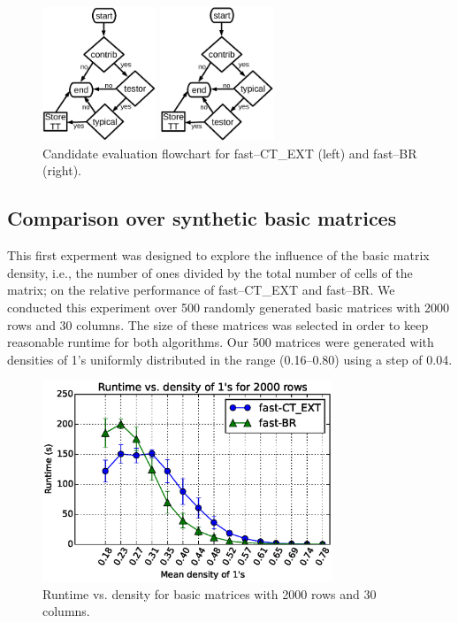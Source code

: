 \documentclass[citenumber]{llncs}
\begin{document}
	\begin{figure}[htb]
	    \centering
	    \begin{minipage}{.5\textwidth}
	        \centering
	        \includegraphics[height=4cm]{ct_ext.eps}
	    \end{minipage}%
	    \begin{minipage}{0.5\textwidth}
	        \centering
	        \includegraphics[height=4cm]{BR.eps}	        
	    \end{minipage}
		\caption{Candidate evaluation flowchart for fast--CT\_EXT (left) and fast--BR (right).}
		\label{fig:candeval}
	\end{figure}
	
%
\subsection{Comparison over synthetic basic matrices}
%
	This first experment was designed to explore the influence of the basic matrix density, i.e., the number of ones divided by the total number of cells of the matrix; on the relative performance of fast--CT\_EXT and fast--BR. We conducted this experiment over 500 randomly generated basic matrices with 2000 rows and 30 columns. The size of these matrices was selected in order to keep reasonable runtime for both algorithms. Our 500 matrices were generated with densities of 1's uniformly distributed in the range (0.16--0.80) using a step of 0.04. 

	\begin{figure}[htb]
		\centering
		\includegraphics[height=6cm]{2000rows.eps}	        
		\caption{Runtime vs. density for basic matrices with 2000 rows and 30 columns.}
		\label{fig:density}
	\end{figure}
\end{document}
